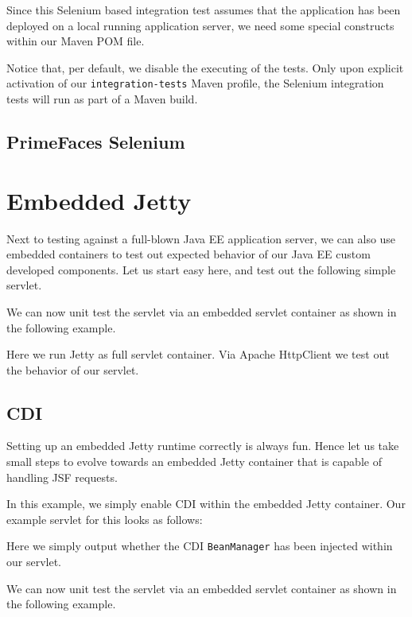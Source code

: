 Since this Selenium based integration test assumes that the application has been deployed on a local running application server, we need some special constructs within our Maven POM file.

Notice that, per default, we disable the executing of the tests.
Only upon explicit activation of our \texttt{integration-tests} Maven profile,
the Selenium integration tests will run as part of a Maven build.

\subsection{PrimeFaces Selenium}

\section{Embedded Jetty}
Next to testing against a full-blown Java EE application server, we can also use embedded containers to test out expected behavior of our Java EE custom developed components.
Let us start easy here, and test out the following simple servlet.


We can now unit test the servlet via an embedded servlet container as shown in the following example.

Here we run Jetty \cite{jetty} as full servlet container.
Via Apache HttpClient \cite{httpclient} we test out the behavior of our servlet.

\subsection{CDI}
Setting up an embedded Jetty runtime correctly is always fun.
Hence let us take small steps to evolve towards an embedded Jetty container that is capable of handling JSF requests.

In this example, we simply enable CDI within the embedded Jetty container.
Our example servlet for this looks as follows:

Here we simply output whether the CDI \texttt{BeanManager} has been injected within our servlet.

We can now unit test the servlet via an embedded servlet container as shown in the following example.


